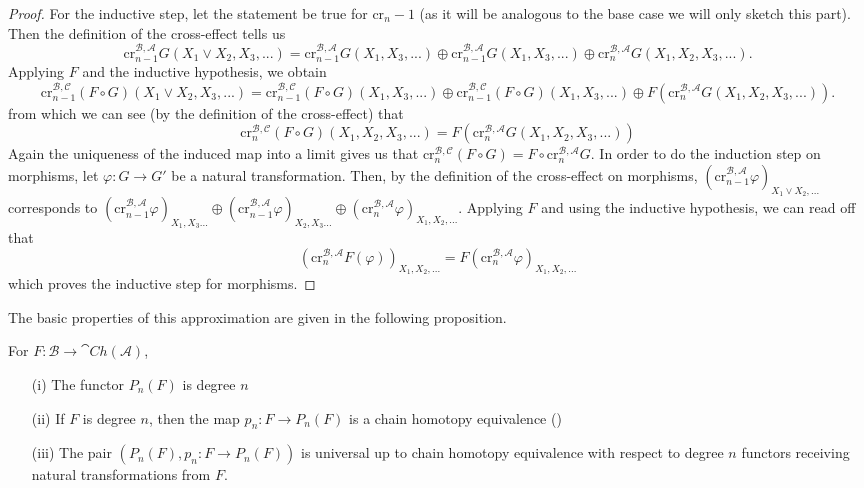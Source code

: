 \begin{proof}
    For the inductive step, let the statement be true for $\text{cr}_n-1$ (as it will be analogous to the base case we will only sketch this part). Then the definition of the cross-effect tells us 
    $$
    \text{cr}^{\mathcal B, \mathcal A}_{n-1}G(X_1 \vee X_2 , X_3 ,...) = 
    \text{cr}^{\mathcal B, \mathcal A}_{n-1}G(X_1 , X_3 ,...) \oplus \text{cr}^{\mathcal B, \mathcal A}_{n-1}G(X_1 , X_3 ,...) \oplus 
    \text{cr}^{\mathcal B, \mathcal A}_{n}G(X_1, X_2 , X_3 ,...).
    $$
    Applying $F$ and the inductive hypothesis, we obtain
    $$
    \text{cr}^{\mathcal B, \mathcal C}_{n-1}(F \circ G)(X_1 \vee X_2 , X_3 ,...) = 
    \text{cr}^{\mathcal B, \mathcal C}_{n-1}(F \circ G)(X_1 , X_3 ,...) \oplus \text{cr}^{\mathcal B, \mathcal C}_{n-1}(F \circ G)(X_1 , X_3 ,...) \oplus 
    F(\text{cr}^{\mathcal B, \mathcal A}_{n}G(X_1, X_2 , X_3 ,...)).
    $$    
    from which we can see (by the definition of the cross-effect) that
    $$
    \text{cr}_n^{\mathcal B, \mathcal C}(F \circ G)(X_1, X_2 , X_3 ,...) =
    F(\text{cr}^{\mathcal B, \mathcal A}_{n}G(X_1, X_2 , X_3 ,...))$$
    Again the uniqueness of the induced map into a limit gives us that 
    $\text{cr}_n^{\mathcal B, \mathcal C}(F \circ G)=
    F \circ \text{cr}^{\mathcal B, \mathcal A}_{n}G$. 
    In order to do the induction step on morphisms, let $\varphi: G \to G'$ be a natural transformation. Then, by the definition of the cross-effect on morphisms, $    (\text{cr}^{\mathcal B, \mathcal A}_{n-1} \varphi)_{X_1 \vee X_2 , ...} $ corresponds to $(\text{cr}^{\mathcal B, \mathcal A}_{n-1} \varphi)_{X_1 , X_3 ...} \oplus (\text{cr}^{\mathcal B, \mathcal A}_{n-1} \varphi)_{X_2 , X_3 ...} \oplus (\text{cr}^{\mathcal B, \mathcal A}_{n} \varphi)_{X_1, X_2 , ...}$. Applying $F$ and using the inductive hypothesis, we can read off that 
    $$
  (\text{cr}^{\mathcal B, \mathcal A}_{n} F(\varphi))_{X_1, X_2 , ...} =   F (\text{cr}^{\mathcal B, \mathcal A}_{n} \varphi)_{X_1, X_2 , ...}
    $$
    which proves the inductive step for morphisms.
\end{proof}

The basic properties of this approximation are given in the following proposition.

\begin{prop}[label=prop:4.5]
    For $F:\mathcal{B}\rightarrow \cat{Ch}(\mathcal{A})$,
    \begin{itemize}
        \item[(i)] The functor $P_n(F)$ is degree $n$
        \item[(ii)] If $F$ is degree $n$, then the map $p_n:F\rightarrow P_n(F)$ is a chain homotopy equivalence ()
        \item[(iii)] The pair $(P_n(F),p_n:F\rightarrow P_n(F))$ is universal up to chain homotopy equivalence with respect to degree $n$ functors receiving natural transformations from $F$.
    \end{itemize}
\end{prop}


